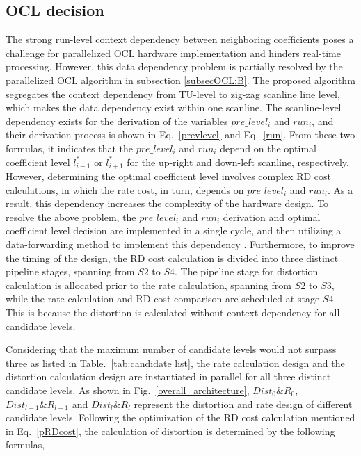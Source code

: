 \documentclass[lettersize,journal]{IEEEtran}
\begin{document}

\subsection{OCL decision}

The strong run-level context dependency between neighboring coefficients poses a challenge for parallelized OCL hardware implementation and hinders real-time processing. However, this data dependency problem is partially resolved by the parallelized OCL algorithm in subsection \ref{subsecOCL:B}. 
The proposed algorithm segregates the context dependency from TU-level to zig-zag scanline line level, which makes the data dependency exist within one scanline. The scanline-level dependency exists for the derivation of the variables $pre\_level_i$ and $run_i$, and their derivation process is shown in Eq.~\eqref{prevlevel} and Eq.~\eqref{run}. From these two formulas, it indicates that the $pre\_level_i$ and $run_i$ depend on the optimal coefficient level $l _{i-1}^{*}$ or $l _{i+1}^{*}$ for the up-right and down-left scanline, respectively. However, determining the optimal coefficient level involves complex RD cost calculations, in which the rate cost, in turn, depends on $pre\_level_i$ and $run_i$. As a result, this dependency increases the complexity of the hardware design. To resolve the above problem, the $pre\_level_i$ and $run_i$ derivation and optimal coefficient level decision are implemented in a single cycle, and then utilizing a data-forwarding method to implement this dependency \cite{harris2010digital}. 
Furthermore, to improve the timing of the design, the RD cost calculation is divided into three distinct pipeline stages, spanning from $S2$ to $S4$. 
The pipeline stage for distortion calculation is allocated prior to the rate calculation, spanning from $S2$ to $S3$, while the rate calculation and RD cost comparison are scheduled at stage $S4$. This is because the distortion is calculated without context dependency for all candidate levels. 
\par
Considering that the maximum number of candidate levels would not surpass three as listed in Table.~\ref{tab:candidate list}, the rate calculation design and the distortion calculation design are instantiated in parallel for all three distinct candidate levels. As shown in Fig.~\ref{overall_architecture}, $Dist_{0}\&R_{0}$, $Dist_{l-1}\&R_{l-1}$ and $Dist_{l}\&R_{l}$ represent the distortion and rate design of different candidate levels. 
Following the optimization of the RD cost calculation mentioned in Eq.~\eqref{pRDcost}, the calculation of distortion is determined by the following formulas,
\end{document}
